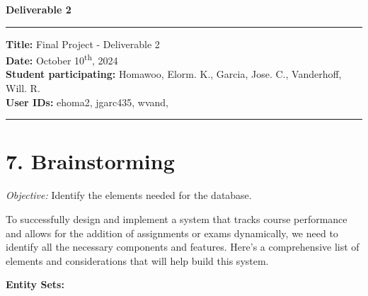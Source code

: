 \documentclass[12pt]{article}
\begin{document}
\begin{center}
    \Large\textbf{Deliverable 2}
\end{center}
\vspace{0.5em}
\hrule
\vspace{1em}

\noindent
\textbf{Title:} Final Project - Deliverable 2 \\
\textbf{Date:} October 10\textsuperscript{th}, 2024 \\
\textbf{Student participating: } Homawoo, Elorm. K., Garcia, Jose. C., Vanderhoff, Will. R. \\
\textbf{User IDs:}  ehoma2, jgarc435, wvand,\\
\vspace{1em}
\hrule

\section*{7. Brainstorming}
\textit{Objective:} Identify the elements needed for the database.

To successfully design and implement a system that tracks course performance and allows for the addition of assignments or exams dynamically, we need to identify all the necessary components and features. Here’s a comprehensive list of elements and considerations that will help build this system.

\textbf{Entity Sets:}
\end{document}
